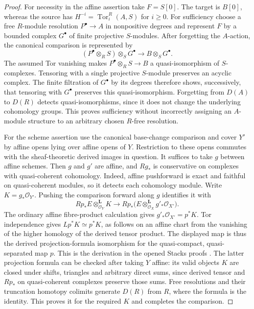 \begin{proof}
For necessity in the affine assertion take $F=S[0]$.
The target is $B[0]$, whereas the source has
$H^{-i}=\operatorname{Tor}_i^R(A,S)$ for $i\geq0$.
For sufficiency choose a free $R$-module resolution $P^\bullet\to A$
in nonpositive degrees and represent $F$ by a bounded complex
$G^\bullet$ of finite projective $S$-modules.  After forgetting the
$A$-action, the canonical comparison is represented by
\[
 (P^\bullet\otimes_R S)\otimes_S G^\bullet
       \longrightarrow B\otimes_S G^\bullet.
\]
The assumed Tor vanishing makes $P^\bullet\otimes_R S\to B$
a quasi-isomorphism of $S$-complexes.  Tensoring with a single
projective $S$-module preserves an acyclic complex.  The finite
filtration of $G^\bullet$ by its degrees therefore shows, successively,
that tensoring with $G^\bullet$ preserves this quasi-isomorphism.
Forgetting from $D(A)$ to $D(R)$ detects quasi-isomorphisms, since
it does not change the underlying cohomology groups.  This proves
sufficiency without incorrectly assigning an $A$-module structure
to an arbitrary chosen $R$-free resolution.

For the scheme assertion use the canonical base-change comparison
and cover $Y'$ by affine opens lying over affine opens of $Y$.
Restriction to these opens commutes with the sheaf-theoretic
derived images in question.  It suffices to take $g$ between affine schemes.
Then $g$ and $g'$ are affine, and $Rg_*$ is conservative on complexes
with quasi-coherent cohomology.  Indeed, affine pushforward is exact
and faithful on quasi-coherent modules, so it detects each cohomology
module.  Write $K=g_*\mathcal O_{Y'}$.  Pushing the comparison forward
along $g$ identifies it with
\[
 Rp_*E\otimes_{\mathcal O_Y}^{\mathbf L}K
       \longrightarrow
 Rp_*\bigl(E\otimes_{\mathcal O_X}^{\mathbf L}
                          g'_*\mathcal O_{X'}\bigr).
\]
The ordinary affine fibre-product calculation gives
$g'_*\mathcal O_{X'}=p^*K$.  Tor independence gives
$Lp^*K\simeq p^*K$, as follows on an affine chart from the
vanishing of the higher homology of the derived tensor product.
The displayed map is thus the derived projection-formula
isomorphism for the quasi-compact, quasi-separated map $p$.
This is the derivation in the opened Stacks proofs
\cite[Tags~08IB and 08EU]{BStacks}.
The latter projection formula can be checked after taking $Y$
affine: its valid objects $K$ are closed under shifts, triangles
and arbitrary direct sums, since derived tensor and $Rp_*$ on
quasi-coherent complexes preserve those sums.  Free resolutions
and their truncation homotopy colimits generate $D(R)$ from $R$,
where the formula is the identity.  This proves it for the required
$K$ and completes the comparison.


\end{proof}
